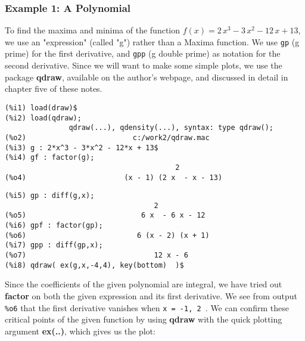\documentclass[12pt]{article}
\begin{document}
\subsubsection{Example 1: A Polynomial}
To find the maxima and minima of the function $f(x)=2\,x^{3} - 3\,x^{2} - 12 \, x + 13$,
  we use an "expression" (called "g") rather than a Maxima function.
We use \verb|gp| (g prime) for the first derivative, and \verb|gpp| (g double prime)
  as notation for the second derivative.
Since we will want to make some simple plots, we use the package \textbf{qdraw}, available
  on the author's webpage, and discussed in detail in chapter five of these notes.  
\small
\begin{verbatim}
(%i1) load(draw)$
(%i2) load(qdraw);
               qdraw(...), qdensity(...), syntax: type qdraw(); 
(%o2)                         c:/work2/qdraw.mac
(%i3) g : 2*x^3 - 3*x^2 - 12*x + 13$
(%i4) gf : factor(g);
                                        2
(%o4)                       (x - 1) (2 x  - x - 13)
\end{verbatim}
\newpage
\begin{verbatim}
(%i5) gp : diff(g,x);
                                   2
(%o5)                           6 x  - 6 x - 12
(%i6) gpf : factor(gp);
(%o6)                          6 (x - 2) (x + 1)
(%i7) gpp : diff(gp,x);
(%o7)                              12 x - 6
(%i8) qdraw( ex(g,x,-4,4), key(bottom)  )$
\end{verbatim}
\normalsize
Since the coefficients of the given polynomial are integral, we have tried out
  \textbf{factor} on both the given expression and its first derivative.
We see from output \verb|%o6| that the first derivative vanishes when \verb|x = -1, 2 |.
We can confirm these critical points of the given function by using \textbf{qdraw} with the
  quick plotting argument \textbf{ex(..)}, which
  gives us the plot:
  
\end{document}
